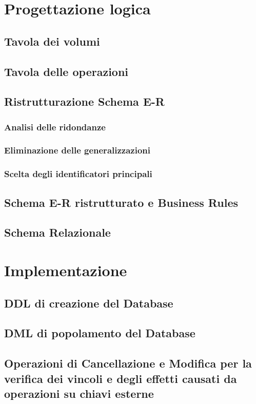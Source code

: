 \documentclass[12pt]{extarticle}
\begin{document}
\section{Progettazione logica}
\subsection{Tavola dei volumi}

\subsection{Tavola delle operazioni}

\subsection{Ristrutturazione Schema E-R}
\subsubsection{Analisi delle ridondanze}
\subsubsection{Eliminazione delle generalizzazioni}
\subsubsection{Scelta degli identificatori principali}

\subsection{Schema E-R ristrutturato e Business Rules}

\subsection{Schema Relazionale}

\section{Implementazione}
\subsection{DDL di creazione del Database}

\subsection{DML di popolamento del Database}

\subsection{Operazioni di Cancellazione e Modifica per la verifica dei vincoli e degli effetti causati da operazioni su chiavi esterne}
\end{document}

